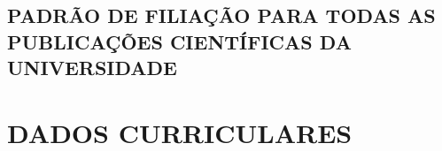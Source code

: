 \documentclass[
  12pt,		%
  a4paper,	%
  openright,  %
  oneside,	%
  chapter=TITLE,		%
  section=TITLE,		%
  english,	%
  french,	    %
  spanish,	%
  brazil	    %
]{abntex2}
\begin{document}
    \begin{anexosenv}
    
        \chapter{PADRÃO DE FILIAÇÃO PARA TODAS AS PUBLICAÇÕES CIENTÍFICAS DA UNIVERSIDADE}
            

         
    \end{anexosenv}
    \newpage
      \clearpage
    \chapter*{DADOS CURRICULARES} 

    \setlength{\extrarowheight}{5pt}
\end{document}
